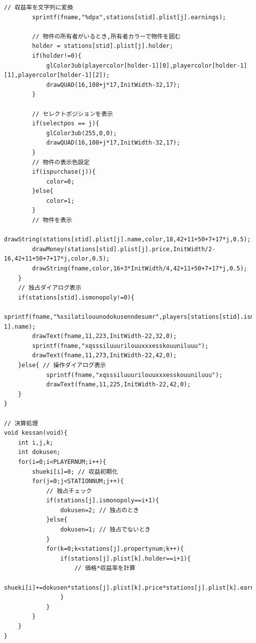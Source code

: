 \documentclass[a4j]{jarticle}
\begin{document}
\begin{lstlisting}[basicstyle=\ttfamily\footnotesize, frame=single,label=code2,caption=game.c]
        // 収益率を文字列に変換
        sprintf(fname,"%dpx",stations[stid].plist[j].earnings);
        
        // 物件の所有者がいるとき,所有者カラーで物件を囲む
        holder = stations[stid].plist[j].holder;
        if(holder!=0){
            glColor3ub(playercolor[holder-1][0],playercolor[holder-1][1],playercolor[holder-1][2]);
            drawQUAD(16,108+j*17,InitWidth-32,17);
        }

        // セレクトポジションを表示
        if(selectpos == j){
            glColor3ub(255,0,0);
            drawQUAD(16,108+j*17,InitWidth-32,17);                 
        }
        // 物件の表示色設定
        if(ispurchase(j)){
            color=0;
        }else{
            color=1;
        }
        // 物件を表示
        drawString(stations[stid].plist[j].name,color,18,42+11+50+7+17*j,0.5);
        drawMoney(stations[stid].plist[j].price,InitWidth/2-16,42+11+50+7+17*j,color,0.5);
        drawString(fname,color,16+3*InitWidth/4,42+11+50+7+17*j,0.5);
    }
    // 独占ダイアログ表示
    if(stations[stid].ismonopoly!=0){
        sprintf(fname,"%ssilatilouunodokusenndesumr",players[stations[stid].ismonopoly-1].name);
        drawText(fname,11,223,InitWidth-22,32,0);
        sprintf(fname,"xqsssiluuurilouuxxxesskouuniluuu");
        drawText(fname,11,273,InitWidth-22,42,0);
    }else{ // 操作ダイアログ表示
            sprintf(fname,"xqsssiluuurilouuxxxesskouuniluuu");
            drawText(fname,11,225,InitWidth-22,42,0);
    }
}

// 決算処理
void kessan(void){
    int i,j,k;
    int dokusen;
    for(i=0;i<PLAYERNUM;i++){
        shueki[i]=0; // 収益初期化
        for(j=0;j<STATIONNUM;j++){
            // 独占チェック
            if(stations[j].ismonopoly==i+1){
                dokusen=2; // 独占のとき
            }else{
                dokusen=1; // 独占でないとき
            }
            for(k=0;k<stations[j].propertynum;k++){
                if(stations[j].plist[k].holder==i+1){
                    // 価格*収益率を計算
                    shueki[i]+=dokusen*stations[j].plist[k].price*stations[j].plist[k].earnings/100;
                }
            }
        }
    }
}


\end{lstlisting}
\end{document}
